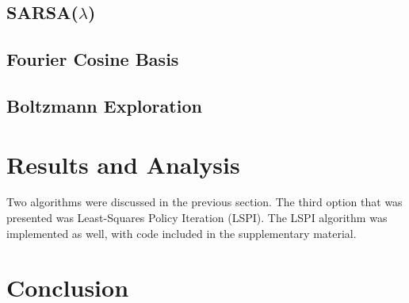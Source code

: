 \documentclass[journal]{IEEEtran}
\begin{document}
\subsection{SARSA($\lambda$)}
\subsection{Fourier Cosine Basis}
\subsection{Boltzmann Exploration}

\section{Results and Analysis}
\label{sec:results}
Two algorithms were discussed in the previous section. 
The third option that was presented was Least-Squares Policy Iteration (LSPI).
The LSPI algorithm was implemented as well, with code included in the supplementary material.


\section{Conclusion}
\label{sec:conclusion}

\label{sec:references}
\printbibliography

\end{document}
